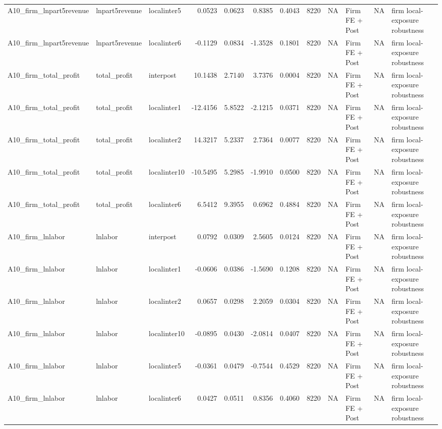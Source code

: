 \begin{table}
\begin{tabular}[t]{lllrrrrrrlll}
A10\_firm\_lnpart5revenue & lnpart5revenue & localinter5 & 0.0523 & 0.0623 & 0.8385 & 0.4043 & 8220 & NA & Firm FE + Post & NA & firm local-exposure robustness\\
\addlinespace
A10\_firm\_lnpart5revenue & lnpart5revenue & localinter6 & -0.1129 & 0.0834 & -1.3528 & 0.1801 & 8220 & NA & Firm FE + Post & NA & firm local-exposure robustness\\
A10\_firm\_total\_profit & total\_profit & interpost & 10.1438 & 2.7140 & 3.7376 & 0.0004 & 8220 & NA & Firm FE + Post & NA & firm local-exposure robustness\\
A10\_firm\_total\_profit & total\_profit & localinter1 & -12.4156 & 5.8522 & -2.1215 & 0.0371 & 8220 & NA & Firm FE + Post & NA & firm local-exposure robustness\\
A10\_firm\_total\_profit & total\_profit & localinter2 & 14.3217 & 5.2337 & 2.7364 & 0.0077 & 8220 & NA & Firm FE + Post & NA & firm local-exposure robustness\\
A10\_firm\_total\_profit & total\_profit & localinter10 & -10.5495 & 5.2985 & -1.9910 & 0.0500 & 8220 & NA & Firm FE + Post & NA & firm local-exposure robustness\\
\addlinespace
A10\_firm\_total\_profit & total\_profit & localinter6 & 6.5412 & 9.3955 & 0.6962 & 0.4884 & 8220 & NA & Firm FE + Post & NA & firm local-exposure robustness\\
A10\_firm\_lnlabor & lnlabor & interpost & 0.0792 & 0.0309 & 2.5605 & 0.0124 & 8220 & NA & Firm FE + Post & NA & firm local-exposure robustness\\
A10\_firm\_lnlabor & lnlabor & localinter1 & -0.0606 & 0.0386 & -1.5690 & 0.1208 & 8220 & NA & Firm FE + Post & NA & firm local-exposure robustness\\
A10\_firm\_lnlabor & lnlabor & localinter2 & 0.0657 & 0.0298 & 2.2059 & 0.0304 & 8220 & NA & Firm FE + Post & NA & firm local-exposure robustness\\
A10\_firm\_lnlabor & lnlabor & localinter10 & -0.0895 & 0.0430 & -2.0814 & 0.0407 & 8220 & NA & Firm FE + Post & NA & firm local-exposure robustness\\
\addlinespace
A10\_firm\_lnlabor & lnlabor & localinter5 & -0.0361 & 0.0479 & -0.7544 & 0.4529 & 8220 & NA & Firm FE + Post & NA & firm local-exposure robustness\\
A10\_firm\_lnlabor & lnlabor & localinter6 & 0.0427 & 0.0511 & 0.8356 & 0.4060 & 8220 & NA & Firm FE + Post & NA & firm local-exposure robustness\\
\bottomrule
\end{tabular}
\end{table}
